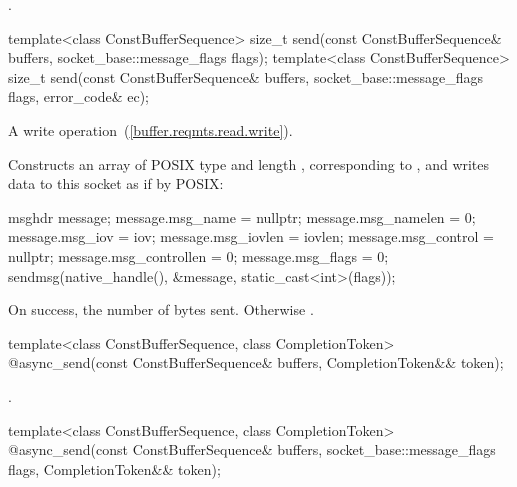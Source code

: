 \begin{itemdescr}
\pnum
\returns {}.
\end{itemdescr}

\begin{itemdecl}
template<class ConstBufferSequence>
  size_t send(const ConstBufferSequence& buffers,
              socket_base::message_flags flags);
template<class ConstBufferSequence>
  size_t send(const ConstBufferSequence& buffers,
              socket_base::message_flags flags, error_code& ec);
\end{itemdecl}

\begin{itemdescr}
\pnum
A write operation~(\ref{buffer.reqmts.read.write}).

\pnum
\effects Constructs an array  of POSIX type  and length , corresponding to , and writes data to this socket as if by POSIX: 
\begin{codeblock}
msghdr message;
message.msg_name = nullptr;
message.msg_namelen = 0;
message.msg_iov = iov;
message.msg_iovlen = iovlen;
message.msg_control = nullptr;
message.msg_controllen = 0;
message.msg_flags = 0;
sendmsg(native_handle(), &message, static_cast<int>(flags));
\end{codeblock}


\pnum
\returns On success, the number of bytes sent. Otherwise .
\end{itemdescr}

\begin{itemdecl}
template<class ConstBufferSequence, class CompletionToken>
  @\DEDUCED@ async_send(const ConstBufferSequence& buffers, CompletionToken&& token);
\end{itemdecl}

\begin{itemdescr}
\pnum
\returns {}.
\end{itemdescr}

\begin{itemdecl}
template<class ConstBufferSequence, class CompletionToken>
  @\DEDUCED@ async_send(const ConstBufferSequence& buffers,
                     socket_base::message_flags flags,
                     CompletionToken&& token);
\end{itemdecl}


